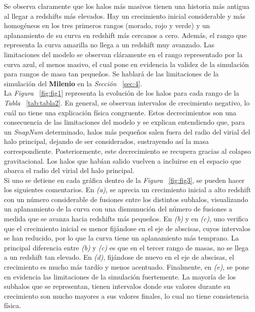 Se observa claramente que los halos más masivos tienen una historia más antigua al llegar a redshifts más elevados. Hay un crecimiento inicial considerable y más homogéneos en los tres primeros rangos (morado, rojo y verde) y un aplanamiento de su curva en redshift más cercanos a cero. Además, el rango que representa la curva amarilla no llega a un redshift muy avanzado. Las limitaciones del modelo se observan cláramente en el rango representado por la curva azul, el menos masivo, el cual pone en evidencia la validez de la simulación para rangos de masa tan pequeños. Se hablará de las limitaciones de la simulación del \textbf{Milenio}\cite{6} en la \textit{Sección} ~\ref{sec:4}. \\

La \textit{Figura} ~\ref{fig:fig1} representa la evolución de los halos para cada rango de la \textit{Tabla} ~\ref{tab:tabla2}. En general, se observan intervalos de crecimiento negativo, lo cuál no tiene una explicación física congruente. Estos decrecimientos son una consecuencia de las limitaciones del modelo y se explican entendiendo que, para un \textit{SnapNum} determinado, halos más pequeños salen fuera del radio del virial del halo principal, dejando de ser considerados, sustrayendo así la masa correspondiente. Posteriormente, este decrecimiento se recupera gracias al colapso gravitacional. Los halos que habían salido vuelven a incluirse en el espacio que abarca el radio del virial del halo principal. \\

Si uno se detiene en cada gráfica dentro de la \textit{Figura} ~\ref{fig:fig3}, se pueden hacer los siguientes comentarios. En \textit{(a)}, se aprecia un crecimiento inicial a alto redshift con un número considerable de fusiones entre los distintos subhalos, visualizando un aplanamiento de la curva con una dismunución del número de fusiones a medida que se avanza hacia redshifts más pequeños. En \textit{(b)} y en \textit{(c)}, uno verifica que el crecimiento inicial es menor fijándose en el eje de abscisas, cuyos intervalos se han reducido, por lo que la curva tiene un aplanamiento más temprano. La principal diferencia entre \textit{(b)} y \textit{(c)} es que en el tercer rango de masas, no se llega a un redshift tan elevado. En \textit{(d)}, fijándose de nuevo en el eje de abscisas, el crecimiento es mucho más tardío y menos acentuado. Finalmente, en \textit{(e)}, se pone en evidencia las limitaciones de la simulación fuertemente. La mayoría de los subhalos que se representan, tienen intervalos donde sus valores durante su crecimiento son mucho mayores a sus valores finales, lo cual no tiene consistencia física. \\



